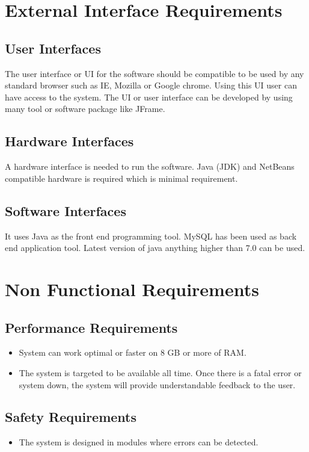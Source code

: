 \documentclass[oneside,a4paper,12pt]{report}
\begin{document}
\section{External Interface Requirements}
\subsection{User Interfaces}
\hspace*{0.5cm} The user interface or UI for the software should be compatible to be used by any standard browser such as IE, Mozilla or Google chrome. Using this UI user can have access to the system. The UI or user interface can be developed  by using many tool or software package like JFrame.

\subsection{Hardware Interfaces}
\hspace*{0.5cm} A hardware interface is needed to run the software. Java (JDK) and NetBeans compatible hardware is required which is minimal requirement. 

\subsection{Software Interfaces}
\hspace*{0.5cm} It uses Java as the front end programming tool. MySQL has been used as  back end application tool. Latest version of java anything higher than 7.0 can be used. 

\newpage

\section{Non Functional Requirements}
\subsection{Performance Requirements}
\begin{itemize}
\item System can work optimal or faster on 8 GB or more of RAM.
\item The system is targeted to be available all time. Once there is a fatal error or system down, the system will provide understandable feedback to the user.
\end{itemize}

\subsection{Safety Requirements}
\begin{itemize}
\item  The system is designed in modules where errors can be detected.
\end{itemize}
\end{document}
